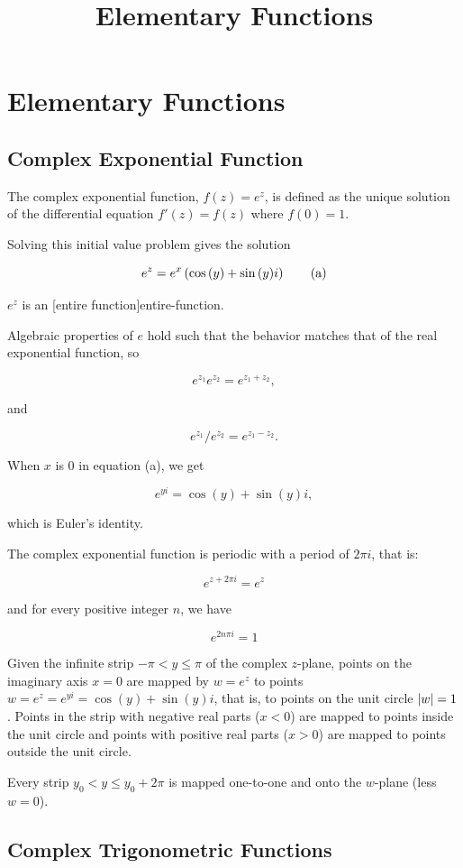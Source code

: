 \documentclass{article}
\title{Elementary Functions}
\begin{document}
\section{Elementary Functions}

\subsection{Complex Exponential Function}

The complex exponential function, $f(z) = e^z$, is defined as the unique solution of the differential equation $f'(z) = f(z)$ where $f(0) = 1$.

Solving this initial value problem gives the solution

\[ e^z = e^x \left(\cos{(y)} + \sin{(y)} i\right) \tag{a} \]

$e^z$ is an \@[entire function]{entire-function}.

Algebraic properties of $e$ hold such that the behavior matches that of the real exponential function, so

\[ e^{z_1} e^{z_2} = e^{z_1 + z_2}, \]

and

\[ e^{z_1} / e^{z_2} = e^{z_1 - z_2}. \]

When $x$ is $0$ in equation (a), we get

\[ e^{yi} = \cos{(y)} + \sin{(y)} i, \]

which is Euler's identity.

The complex exponential function is periodic with a period of $2 \pi i$, that is:

\[ e^{z+2\pi i} = e^z \]

and for every positive integer $n$, we have

\[ e^{2 n \pi i} = 1 \]

Given the infinite strip $-\pi < y \le \pi$ of the complex $z$-plane, points on the imaginary axis $x = 0$ are mapped by $w = e^z$ to points $w = e^z = e^{yi} = \cos{(y)} + \sin{(y)} i$, that is, to points on the unit circle $\left| w \right| = 1$. Points in the strip with negative real parts ($x < 0$) are mapped to points inside the unit circle and points with positive real parts ($x > 0$) are mapped to points outside the unit circle.

Every strip $y_0 < y \le y_0 + 2\pi$ is mapped one-to-one and onto the $w$-plane (less $w = 0$).

\subsection{Complex Trigonometric Functions}
\end{document}

